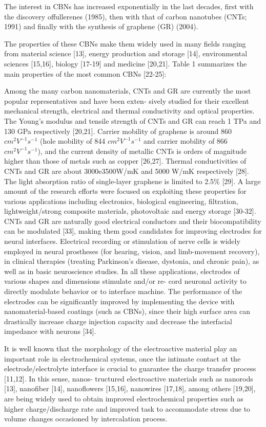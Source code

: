 The interest in CBNs has increased exponentially in the last
decades, first with the discovery offullerenes (1985), then with that of carbon nanotubes (CNTs; 1991) and finally with the synthesis of graphene (GR) (2004).

The properties of these CBNs make them widely used in many
fields ranging from material science [13], energy production and storage [14], environmental sciences [15,16], biology [17-19] and medicine [20,21]. Table 1 summarizes the main properties of the most common CBNs [22-25]:

Among the many carbon nanomaterials, CNTs and GR are currently the most popular representatives and have been exten- sively studied for their excellent mechanical strength, electrical and thermal conductivity and optical properties. The Young's modulus and tensile strength of CNTs and GR can reach 1 TPa and 130 GPa respectively [20,21]. Carrier mobility of graphene is around 860 $cm^{2} V^{-1} s^{-1}$ (hole mobility of 844 $cm^{2} V^{-1} s^{-1}$ and carrier mobility of 866 $cm^{2} V^{-1} s^{-1}$), and the current density of metallic CNTs is orders of magnitude higher than those of metals such as copper [26,27]. Thermal conductivities of CNTs and GR are about 3000e3500W/mK and 5000 W/mK respectively [28]. The light absorption ratio of single-layer graphene is limited to 2.5\% [29]. A large amount of the research efforts were focused on exploiting these properties for various applications including electronics, biological engineering, filtration, lightweight/strong composite materials, photovoltaic and energy storage [30-32]. CNTs and GR are naturally good electrical conductors and their biocompatibility can be modulated [33], making them good candidates for improving electrodes for neural interfaces. Electrical recording or stimulation of nerve cells is widely employed in neural prostheses (for hearing, vision, and limb-movement recovery), in clinical therapies (treating Parkinson's disease, dystonia, and chronic pain), as well as in basic neuroscience studies. In all these applications, electrodes of various shapes and dimensions stimulate and/or re- cord neuronal activity to directly modulate behavior or to interface machine. The performance of the electrodes can be significantly improved by implementing the device with nanomaterial-based coatings (such as CBNs), since their high surface area can drastically increase charge injection capacity and decrease the interfacial impedance with neurons [34].

It is well known that the morphology of the electroactive material play an important role in electrochemical systems, once the intimate contact at the electrode/electrolyte interface is crucial to guarantee the charge transfer process [11,12]. In this sense, nanos- tructured electroactive materials such as nanorods [13], nanofiber [14], nanoflowers [15,16], nanowires [17,18], among others [19,20], are being widely used to obtain improved electrochemical properties such as higher charge/discharge rate and improved task to accommodate stress due to volume changes occasioned by intercalation process.


